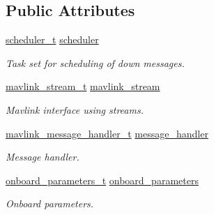 \subsection*{Public Attributes}
\begin{DoxyCompactItemize}
\item 
\hypertarget{structmavlink__communication__t_a0297a1fdf711a3e5b590e19350be1e93}{\hyperlink{structscheduler__t}{scheduler\+\_\+t} \hyperlink{structmavlink__communication__t_a0297a1fdf711a3e5b590e19350be1e93}{scheduler}}\label{structmavlink__communication__t_a0297a1fdf711a3e5b590e19350be1e93}

\begin{DoxyCompactList}\small\item\em Task set for scheduling of down messages. \end{DoxyCompactList}\item 
\hypertarget{structmavlink__communication__t_aa91f63ff5e68dffb9af36c4b5fae8aca}{\hyperlink{structmavlink__stream__t}{mavlink\+\_\+stream\+\_\+t} \hyperlink{structmavlink__communication__t_aa91f63ff5e68dffb9af36c4b5fae8aca}{mavlink\+\_\+stream}}\label{structmavlink__communication__t_aa91f63ff5e68dffb9af36c4b5fae8aca}

\begin{DoxyCompactList}\small\item\em Mavlink interface using streams. \end{DoxyCompactList}\item 
\hypertarget{structmavlink__communication__t_ab1543995f45f5b490737d0cea4fe0a8a}{\hyperlink{structmavlink__message__handler__t}{mavlink\+\_\+message\+\_\+handler\+\_\+t} \hyperlink{structmavlink__communication__t_ab1543995f45f5b490737d0cea4fe0a8a}{message\+\_\+handler}}\label{structmavlink__communication__t_ab1543995f45f5b490737d0cea4fe0a8a}

\begin{DoxyCompactList}\small\item\em Message handler. \end{DoxyCompactList}\item 
\hypertarget{structmavlink__communication__t_a211c3c642efda3407b3abeafa7cc9f19}{\hyperlink{structonboard__parameters__t}{onboard\+\_\+parameters\+\_\+t} \hyperlink{structmavlink__communication__t_a211c3c642efda3407b3abeafa7cc9f19}{onboard\+\_\+parameters}}\label{structmavlink__communication__t_a211c3c642efda3407b3abeafa7cc9f19}

\begin{DoxyCompactList}\small\item\em Onboard parameters. \end{DoxyCompactList}\end{DoxyCompactItemize}


